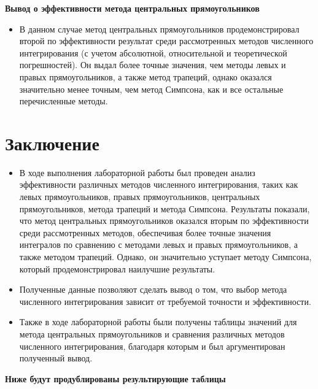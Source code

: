 \documentclass{article}
\begin{document}
\textbf{\large{Вывод о эффективности метода центральных прямоугольников}} \\
\begin{itemize}
    \item В данном случае метод центральных прямоугольников продемонстрировал второй по эффективности результат среди рассмотренных методов численного интегрирования (с учетом абсолютной, относительной и теоретической погрешностей). Он выдал более точные значения, чем методы левых и правых прямоугольников, а также метод трапеций, однако оказался значительно менее точным, чем метод Симпсона, как и все остальные перечисленные методы.
\end{itemize}

\section*{Заключение}
 \begin{itemize}
     \item В ходе выполнения лабораторной работы был проведен анализ эффективности различных методов численного интегрирования, таких как левых прямоугольников, правых прямоугольников, центральных прямоугольников, метода трапеций и метода Симпсона. Результаты показали, что метод центральных прямоугольников оказался вторым по эффективности среди рассмотренных методов, обеспечивая более точные значения интегралов по сравнению с методами левых и правых прямоугольников, а также методом трапеций. Однако, он значительно уступает методу Симпсона, который продемонстрировал наилучшие результаты.
     \item Полученные данные позволяют сделать вывод о том, что выбор метода численного интегрирования зависит от требуемой точности и эффективности.
     \item Также в ходе лабораторной работы были получены таблицы  значений для метода центральных прямоугольников и сравнения различных методов численного интегрирования, благодаря которым и был аргументирован полученный вывод.
     
 \end{itemize}

 \textbf{\large{Ниже будут продублированы результирующие таблицы}} \\
 
\end{document}
